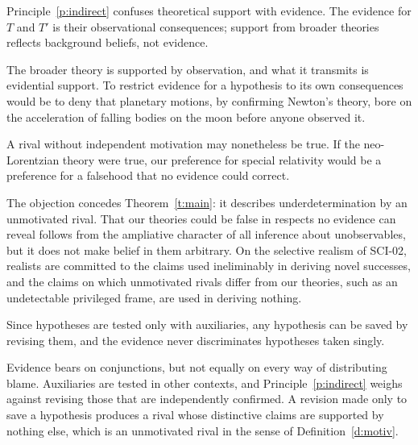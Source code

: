 \documentclass{situationist-preprint}
\begin{document}
\begin{objection}
Principle~\ref{p:indirect} confuses theoretical support with evidence. The evidence for $T$ and $T'$ is their observational consequences; support from broader theories reflects background beliefs, not evidence.
\end{objection}

\begin{reply}
The broader theory is supported by observation, and what it transmits is evidential support. To restrict evidence for a hypothesis to its own consequences would be to deny that planetary motions, by confirming Newton's theory, bore on the acceleration of falling bodies on the moon before anyone observed it.
\end{reply}

\begin{objection}
A rival without independent motivation may nonetheless be true. If the neo-Lorentzian theory were true, our preference for special relativity would be a preference for a falsehood that no evidence could correct.
\end{objection}

\begin{reply}
The objection concedes Theorem~\ref{t:main}: it describes underdetermination by an unmotivated rival. That our theories could be false in respects no evidence can reveal follows from the ampliative character of all inference about unobservables, but it does not make belief in them arbitrary. On the selective realism of SCI-02, realists are committed to the claims used ineliminably in deriving novel successes, and the claims on which unmotivated rivals differ from our theories, such as an undetectable privileged frame, are used in deriving nothing.
\end{reply}

\begin{objection}[Duhem]
Since hypotheses are tested only with auxiliaries, any hypothesis can be saved by revising them, and the evidence never discriminates hypotheses taken singly.
\end{objection}

\begin{reply}
Evidence bears on conjunctions, but not equally on every way of distributing blame. Auxiliaries are tested in other contexts, and Principle~\ref{p:indirect} weighs against revising those that are independently confirmed. A revision made only to save a hypothesis produces a rival whose distinctive claims are supported by nothing else, which is an unmotivated rival in the sense of Definition~\ref{d:motiv}.
\end{reply}
\end{document}
